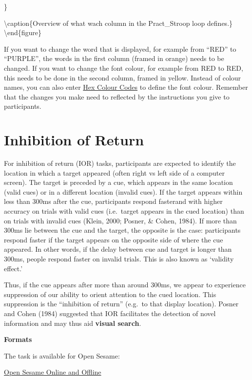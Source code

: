 \documentclass[
]{book}
\begin{document}
\}

\textbackslash caption\{Overview of what wach column in the Pract\_Stroop loop defines.\}\label{fig:Figure2-17}
\textbackslash end\{figure\}

If you want to change the word that is displayed, for example from ``RED'' to ``PURPLE'', the words in the first column (framed in orange) needs to be changed. If you want to change the font colour, for example from {RED} to {RED}, this needs to be done in the second column, framed in yellow. Instead of colour names, you can also enter \href{https://htmlcolorcodes.com/}{Hex Colour Codes} to define the font colour. Remember that the changes you make need to reflected by the instructions you give to participants.

\hypertarget{inhibition-of-return}{%
\section{Inhibition of Return}\label{inhibition-of-return}}

For inhibition of return (IOR) tasks, participants are expected to identify the location in which a target appeared (often right vs left side of a computer screen). The target is preceded by a cue, which appears in the same location (valid cues) or in a different location (invalid cues). If the target appears within less than 300ms after the cue, participants respond fasterand with higher accuracy on trials with valid cues (i.e.~target appears in the cued location) than on trials with invalid cues (Klein, 2000; Posner, \& Cohen, 1984). If more than 300ms lie between the cue and the target, the opposite is the case: participants respond faster if the target appears on the opposite side of where the cue appeared. In other words, if the delay between cue and target is longer than 300ms, people respond faster on invalid trials. This is also known as `validity effect.'

Thus, if the cue appears after more than around 300ms, we appear to experience suppression of our ability to orient attention to the cued location. This suppression is the ``inhibition of return'' (e.g.~to that display location). Posner and Cohen (1984) suggested that IOR facilitates the detection of novel information and may thus aid \textbf{visual search}.

\textbf{Formats}

The task is available for Open Sesame:

\href{link\%20here}{Open Sesame Online and Offline}
\end{document}
